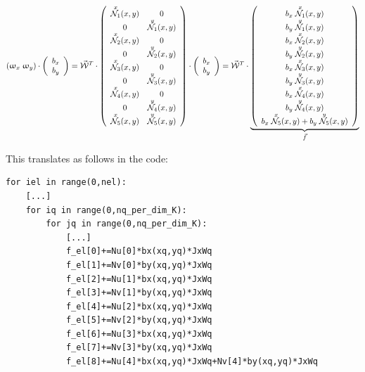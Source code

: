 \[
(\upomega_x \; \upomega_y) \cdot 
\left(
\begin{array}{c}
b_x \\ b_y
\end{array}
\right)
= 
\vec{\cal W}^T \cdot 
\left(
\begin{array}{cc}
\overset{\tiny x}{{\mathcal{N}}_1}(x,y) & 0 \\
0 & \overset{\tiny y}{{\mathcal{N}}_1}(x,y) \\
\overset{\tiny x}{{\mathcal{N}}_2}(x,y) & 0 \\
0 & \overset{\tiny y}{{\mathcal{N}}_2}(x,y) \\
\overset{\tiny x}{{\mathcal{N}}_3}(x,y) & 0 \\
0 & \overset{\tiny y}{{\mathcal{N}}_3}(x,y) \\
\overset{\tiny x}{{\mathcal{N}}_4}(x,y) & 0 \\
0 & \overset{\tiny y}{{\mathcal{N}}_4}(x,y) \\
\overset{\tiny x}{{\mathcal{N}}_5}(x,y)  & \overset{\tiny y}{{\mathcal{N}}_5}(x,y) 
\end{array}
\right)
\cdot
\left(
\begin{array}{c}
b_x \\ b_y
\end{array}
\right)
=
\vec{\cal W}^T \cdot 
\underbrace{
\left(
\begin{array}{c}
b_x\; \overset{\tiny x}{{\mathcal{N}}_1}(x,y) \\
b_y\; \overset{\tiny y}{{\mathcal{N}}_1}(x,y) \\
b_x\; \overset{\tiny x}{{\mathcal{N}}_2}(x,y) \\
b_y\; \overset{\tiny y}{{\mathcal{N}}_2}(x,y) \\
b_x\; \overset{\tiny x}{{\mathcal{N}}_3}(x,y) \\
b_y\; \overset{\tiny y}{{\mathcal{N}}_3}(x,y) \\
b_x\; \overset{\tiny x}{{\mathcal{N}}_4}(x,y) \\
b_y\; \overset{\tiny y}{{\mathcal{N}}_4}(x,y) \\
b_x\; \overset{\tiny x}{{\mathcal{N}}_5}(x,y) +b_y\; \overset{\tiny y}{{\mathcal{N}}_5}(x,y) 
\end{array}
\right)
}_{\vec{f}}
\]

This translates as follows in the code:
\begin{lstlisting}
for iel in range(0,nel):
    [...]
    for iq in range(0,nq_per_dim_K):
        for jq in range(0,nq_per_dim_K):
            [...]
            f_el[0]+=Nu[0]*bx(xq,yq)*JxWq
            f_el[1]+=Nv[0]*by(xq,yq)*JxWq
            f_el[2]+=Nu[1]*bx(xq,yq)*JxWq
            f_el[3]+=Nv[1]*by(xq,yq)*JxWq
            f_el[4]+=Nu[2]*bx(xq,yq)*JxWq
            f_el[5]+=Nv[2]*by(xq,yq)*JxWq
            f_el[6]+=Nu[3]*bx(xq,yq)*JxWq
            f_el[7]+=Nv[3]*by(xq,yq)*JxWq
            f_el[8]+=Nu[4]*bx(xq,yq)*JxWq+Nv[4]*by(xq,yq)*JxWq
\end{lstlisting}

